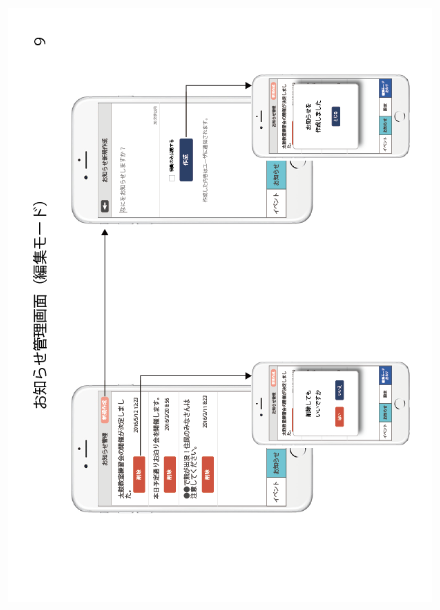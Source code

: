 \begin{figure}[h]
    \begin{center}
      \includegraphics[keepaspectratio, scale=0.7]{appendixs/appendixB_figres/fig9.png}
    \end{center}
\end{figure}
